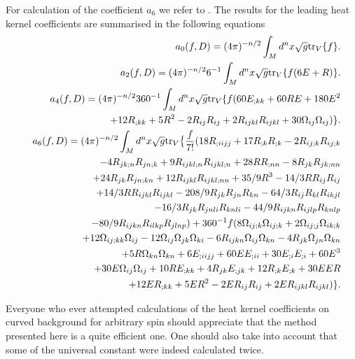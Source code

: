 For calculation of the coefficient $a_6$ we refer to
\cite{Gilkey1975}. The results for the leading heat kernel
coefficients are summarised in the following equations
\begin{eqnarray}
&&a_{0}(f,D)=(4\pi)^{-n/2}\int_M d^nx\sqrt{g} {\rm tr}_V\{f\}. \label{a0nobou}\\
&&a_2(f,D)
         =(4\pi)^{-n/2}6^{-1}\int_M d^nx\sqrt{g} {\rm tr}_V\{f(6E+R)\}.\label{a2nobou}\\
&&   a_4(f,D)=(4\pi)^{-n/2}360^{-1}\int_M d^nx\sqrt{g} {\rm tr}_V\{f(60E_{;kk}
    +60R E+180E^2 \nonumber \\
&&\qquad\qquad
    +12R_{;kk}+5R^2-2 R_{ij}R_{ij}
    +2 R_{ijkl}R_{ijkl}+30\Omega_{ ij}\Omega_{ij})\}.\label{a4nobou} \\
&&a_{6}(f,D)=(4\pi)^{-n/2}\int_M d^nx\sqrt{g} {\rm tr}_V\bigl\{ \frac f{7!}(
    18R_{;ii jj}+17R_{;k}R_{;k}
    -2R_{ij;k}R_{ ij;k} \nonumber \\
&&\qquad\qquad -4R_{jk;n}R_{jn;k}
    +9R_{ij kl;n}R_{ij kl;n}+28RR_{;nn}
    -8R_{jk}R_{jk;nn} \nonumber \\
&&\qquad\qquad
    +24R_{ jk}R_{jn;kn}
    +12R_{ij kl}R_{ij kl ;nn}
    +35/9R^{3}
    -14/3RR_{ij}R_{ij} \nonumber \\
&&\qquad\qquad
    +14/3R R_{ijkl}R_{ijkl}
     -208/9R_{jk}R_{jn}R_{kn}
     -64/3R_{ ij}R_{kl}R_{ik jl} \nonumber \\
&&\qquad\qquad
     -16/3R_{jk}R_{jn l i}R_{kn l i}
     -44/9R_{ij kn}R_{ij l p}R_{kn l p} \nonumber\\
&&\qquad\qquad
     -80/9R_{ij kn}R_{il  kp}R_{jl  np})
     +360^{-1}f(
      8\Omega_{ij;k} \Omega_{ij;k}
     +2\Omega_{ij;j}\Omega_{ ik;k}\nonumber \\
&&\qquad\qquad
     +12\Omega_{ij;kk}\Omega_{ij}
     -12\Omega_{ij}\Omega_{jk}\Omega_{ki}
     -6R_{ij kn}\Omega_{ij}\Omega_{kn}
     -4R_{jk}\Omega_{jn}\Omega_{kn}
\nonumber \\
&&\qquad\qquad
       +5R\Omega_{kn}\Omega_{kn}
     +6E_{;ii jj}+60EE_{;ii}
      +30E_{;i}E_{;i}
     +60E^{3}
\nonumber \\
&&\qquad\qquad
     +30E\Omega_{ij}\Omega_{ij}
     +10R E_{;kk}+4R_{jk}E_{;jk}
     +12R_{;k}E_{;k}+30EER
     \nonumber \\
&&\qquad\qquad
      +12ER_{;kk}+5ER^2
     -2ER_{ij}R_{ij}+2ER_{ijkl}R_{ijkl})\}.\label{a6nobou}
\end{eqnarray}

Everyone who ever attempted calculations of the heat kernel
coefficients on curved background for arbitrary spin should
appreciate that the method presented here is a quite
efficient one. One should also take into account that some
of the universal constant were indeed calculated twice.

